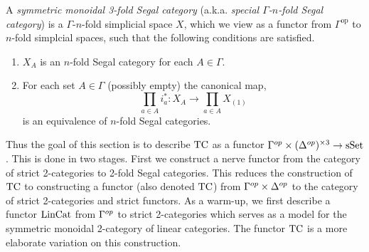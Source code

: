 \documentclass{amsart}
\begin{document}


\begin{definition}
	A {\em symmetric monoidal 3-fold Segal category} (a.k.a. {\em special $\Gamma$-$n$-fold Segal category}) is a $\Gamma$-$n$-fold simplicial space $X$, which we view as a functor from $\Gamma^\textrm{op}$ to $n$-fold simplcial spaces, such that the following conditions are satisfied. 
	\begin{enumerate}
		\item $X_A$ is an $n$-fold Segal category for each $A \in \Gamma$. 
		\item For each set $A \in \Gamma$ (possibly empty) the canonical map,
		\begin{equation*}
			\prod_{a \in A} i_a^*: X_A \to \prod_{a \in A} X_{(1)}
		\end{equation*}
		is an equivalence of $n$-fold Segal categories. %
	\end{enumerate}
\end{definition}


Thus the goal of this section is to describe $\mathrm{TC}$ as a functor $\Gamma^{{op}} \times (\Delta^{{op}})^{\times 3} \to \mathrm{sSet}$. This is done in two stages. First we construct a nerve functor from the category of strict 2-categories to 2-fold Segal categories. This reduces the construction of $\mathrm{TC}$ to constructing a functor (also denoted $\mathrm{TC}$) from $\Gamma^{{op}} \times \Delta^{{op}}$ to the category of strict 2-categories and strict functors. As a warm-up, we first describe a functor $\mathrm{LinCat}$ from $\Gamma^{{op}}$ to strict 2-categories which serves as a model for the symmetric monoidal 2-category of linear categories. The functor $\mathrm{TC}$ is a more elaborate variation on this construction. 
\end{document}
